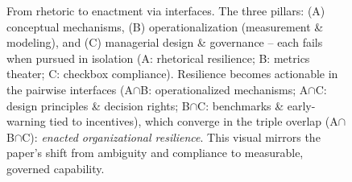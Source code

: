 \begin{figure}[t]
    \caption{From rhetoric to enactment via interfaces. The three pillars: (A) conceptual mechanisms, (B) operationalization (measurement \& modeling), and (C) managerial design \& governance -- each fails when pursued in isolation (A: rhetorical resilience; B: metrics theater; C: checkbox compliance). Resilience becomes actionable in the pairwise interfaces (A$\cap$B: operationalized mechanisms; A$\cap$C: design principles \& decision rights; B$\cap$C: benchmarks \& early-warning tied to incentives), which converge in the triple overlap (A$\cap$B$\cap$C): \emph{enacted organizational resilience}. This visual mirrors the paper’s shift from ambiguity and compliance to measurable, governed capability.}
    \label{fig:VennD}
\end{figure}






